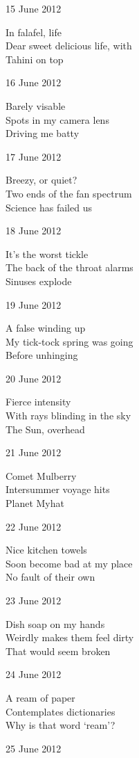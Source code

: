 \documentclass[12pt]{article}
\begin{document}
15 June 2012

In falafel, life \\
Dear sweet delicious life, with \\
Tahini on top

16 June 2012

Barely visable \\
Spots in my camera lens \\
Driving me batty

\newpage

17 June 2012

Breezy, or quiet? \\
Two ends of the fan spectrum \\
Science has failed us

18 June 2012

It's the worst tickle \\
The back of the throat alarms \\
Sinuses explode

19 June 2012

A false winding up \\
My tick-tock spring was going \\
Before unhinging

20 June 2012

Fierce intensity \\
With rays blinding in the sky \\
The Sun, overhead

21 June 2012

Comet Mulberry \\
Intersummer voyage hits \\
Planet Myhat

22 June 2012

Nice kitchen towels \\
Soon become bad at my place \\
No fault of their own

23 June 2012

Dish soap on my hands \\
Weirdly makes them feel dirty \\
That would seem broken

\newpage

24 June 2012

A ream of paper \\
Contemplates dictionaries \\
Why is that word `ream'?

25 June 2012
\end{document}
